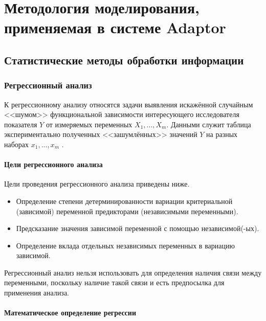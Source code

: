 \section{Методология моделирования, применяемая в системе Adaptor}
\subsection{Статистические методы обработки информации}
\subsubsection{Регрессионный анализ}

К регрессионному анализу относятся задачи выявления искажённой случайным <<шумом>> функциональной зависимости интересующего исследователя показателя $Y$ от измеряемых переменных $X_1,...,X_m$. Данными служит таблица экспериментально полученных <<зашумлённых>> значений $Y$ на разных наборах $x_1,...,x_m$ \cite{lag}.

\paragraph{Цели регрессионного анализа}
Цели проведения регрессионного анализа приведены ниже.
\begin{itemize}
    \item Определение степени детерминированности вариации критериальной (зависимой) переменной предикторами (независимыми переменными).
    \item Предсказание значения зависимой переменной с помощью независимой(-ых).
    \item Определение вклада отдельных независимых переменных в вариацию зависимой.
\end{itemize}

Регрессионный анализ нельзя использовать для определения наличия связи между переменными, поскольку наличие такой связи и есть предпосылка для применения анализа.

\paragraph{Математическое определение регрессии}

